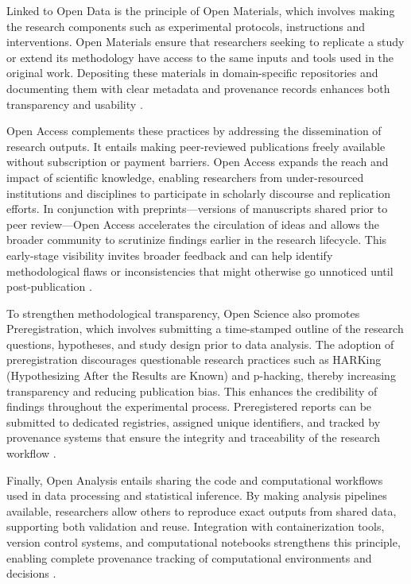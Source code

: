 \documentclass{article}
\begin{document}
Linked to Open Data is the principle of Open Materials, which involves making the research components such as experimental protocols, instructions and interventions. Open Materials ensure that researchers seeking to replicate a study or extend its methodology have access to the same inputs and tools used in the original work. Depositing these materials in domain-specific repositories and documenting them with clear metadata and provenance records enhances both transparency and usability \cite{van_dijk_open_2021}.

Open Access complements these practices by addressing the dissemination of research outputs. It entails making peer-reviewed publications freely available without subscription or payment barriers. Open Access expands the reach and impact of scientific knowledge, enabling researchers from under-resourced institutions and disciplines to participate in scholarly discourse and replication efforts. In conjunction with preprints—versions of manuscripts shared prior to peer review—Open Access accelerates the circulation of ideas and allows the broader community to scrutinize findings earlier in the research lifecycle. This early-stage visibility invites broader feedback and can help identify methodological flaws or inconsistencies that might otherwise go unnoticed until post-publication \cite{van_dijk_open_2021}.

To strengthen methodological transparency, Open Science also promotes Preregistration, which involves submitting a time-stamped outline of the research questions, hypotheses, and study design prior to data analysis. The adoption of preregistration discourages questionable research practices such as HARKing (Hypothesizing After the Results are Known) and p-hacking, thereby increasing transparency and reducing publication bias. This enhances the credibility of findings throughout the experimental process. Preregistered reports can be submitted to dedicated registries, assigned unique identifiers, and tracked by provenance systems that ensure the integrity and traceability of the research workflow \cite{van_dijk_open_2021}.

Finally, Open Analysis entails sharing the code and computational workflows used in data processing and statistical inference. By making analysis pipelines available, researchers allow others to reproduce exact outputs from shared data, supporting both validation and reuse. Integration with containerization tools, version control systems, and computational notebooks strengthens this principle, enabling complete provenance tracking of computational environments and decisions \cite{van_dijk_open_2021}.
\end{document}
